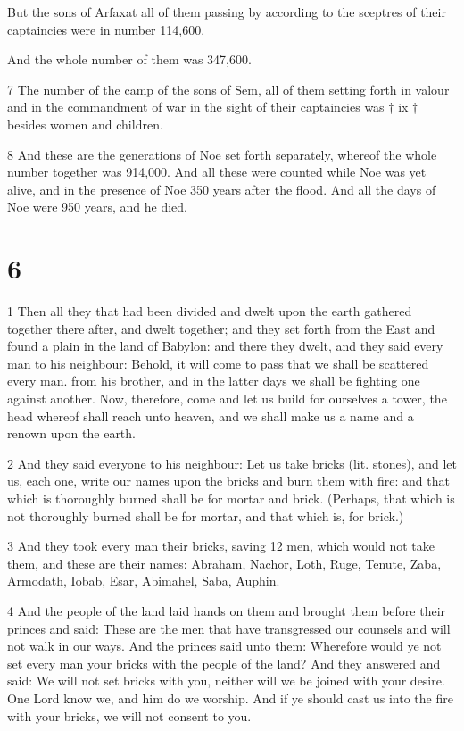 \par But the sons of Arfaxat all of them passing by according to the sceptres of their captaincies were in number 114,600.

\par And the whole number of them was 347,600. 

\par 7 The number of the camp of the sons of Sem, all of them setting forth in valour and in the commandment of war in the sight of their captaincies was † ix † besides women and children.

\par 8 And these are the generations of Noe set forth separately, whereof the whole number together was 914,000. And all these were counted while Noe was yet alive, and in the presence of Noe 350 years after the flood. And all the days of Noe were 950 years, and he died.

\chapter{6}

\par 1 Then all they that had been divided and dwelt upon the earth gathered together there after, and dwelt together; and they set forth from the East and found a plain in the land of Babylon: and there they dwelt, and they said every man to his neighbour: Behold, it will come to pass that we shall be scattered every man. from his brother, and in the latter days we shall be fighting one against another. Now, therefore, come and let us build for ourselves a tower, the head whereof shall reach unto heaven, and we shall make us a name and a renown upon the earth.

\par 2 And they said everyone to his neighbour: Let us take bricks (lit. stones), and let us, each one, write our names upon the bricks and burn them with fire: and that which is thoroughly burned shall be for mortar and brick. (Perhaps, that which is not thoroughly burned shall be for mortar, and that which is, for brick.)

\par 3 And they took every man their bricks, saving 12 men, which would not take them, and these are their names: Abraham, Nachor, Loth, Ruge, Tenute, Zaba, Armodath, Iobab, Esar, Abimahel, Saba, Auphin. 

\par 4 And the people of the land laid hands on them and brought them before their princes and said: These are the men that have transgressed our counsels and will not walk in our ways. And the princes said unto them: Wherefore would ye not set every man your bricks with the people of the land? And they answered and said: We will not set bricks with you, neither will we be joined with your desire. One Lord know we, and him do we worship. And if ye should cast us into the fire with your bricks, we will not consent to you. 

